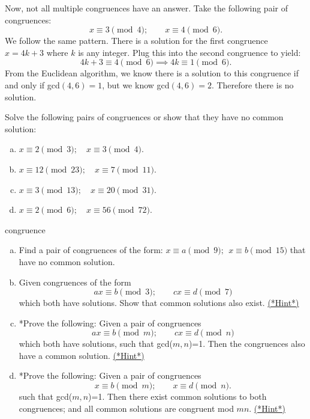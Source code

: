Now, not all multiple congruences have an answer.  Take the following pair of congruences:
\[x \equiv 3 \pmod 4; \qquad x \equiv 4 \pmod 6.\]
We follow the same pattern.  There is a solution for the first congruence $x = 4k + 3$ where $k$ is any integer.  Plug this into the second congruence to yield:
\[4k + 3 \equiv 4 \pmod 6 \implies 4k \equiv 1 \pmod 6.\]
From the Euclidean algorithm, we know there is a solution to this congruence if and only if gcd$(4,6) = 1$, but we know gcd$(4,6) = 2$.  Therefore there is no solution.  


\begin{exercise}{}
Solve the following pairs of congruences or show that they have no common solution:
\begin {enumerate}[(a)]
\item
$x \equiv 2 \pmod{3}; \quad x \equiv 3 \pmod{4}.$
\item
$x \equiv 12 \pmod{23}; \quad x \equiv 7 \pmod{11}.$
\item
$x \equiv 3 \pmod{13}; \quad x \equiv 20 \pmod{31}.$
\item
$x \equiv 2 \pmod{6}; \quad  x \equiv 56 \pmod{72}.$
\end {enumerate}
\end {exercise}

\begin {exercise}{congruence}
\begin{enumerate}[(a)]
\item
Find a pair of congruences of the form: $x \equiv a \pmod{9};~~x \equiv b \pmod{15}$ that have no common solution.
\item
Given congruences of the form 
\[ ax \equiv b \pmod{3}; \qquad cx \equiv d \pmod{7} \]
which both have solutions.  Show that  common solutions also exist.
 \hyperref[sec:modular_arithmetic:hints]{(*Hint*)}
\item
*Prove the following: Given a pair of congruences
\[ ax \equiv b \pmod{m}; \qquad cx \equiv d \pmod{n} \]
 which both have solutions, such that gcd($m,n$)=1. Then the congruences also have a common solution.
 \hyperref[sec:modular_arithmetic:hints]{(*Hint*)}
\item
*Prove the following: Given a pair of congruences
\[ x \equiv b \pmod{m}; \qquad x \equiv d \pmod{n}. \]
 such that gcd($m,n$)=1. Then there exist common solutions to both congruences; and all common solutions are congruent mod $mn$.
 \hyperref[sec:modular_arithmetic:hints]{(*Hint*)}
\end{enumerate}
\end{exercise}


